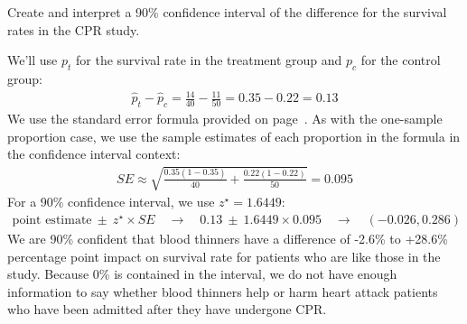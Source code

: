 \begin{examplewrap}
\begin{nexample}{
    Create and interpret a 90\% confidence interval of the
    difference for the survival rates in the CPR study.}

  We'll use $p_t$ for the survival
  rate in the treatment group and $p_c$ for the control
  group:
  \begin{align*}
  \hat{p}_{t} - \hat{p}_{c}
    = \frac{14}{40} - \frac{11}{50}
    = 0.35 - 0.22
    = 0.13
  \end{align*}
  We use the standard error formula provided on
  page~\pageref{seForDiffOfProp}.
  As with the one-sample proportion case,
  we use the sample estimates of each proportion
  in the formula in the confidence interval context:
  \begin{align*}
  SE \approx \sqrt{\frac{0.35 (1 - 0.35)}{40} +
      \frac{0.22 (1 - 0.22)}{50}}
    = 0.095
  \end{align*}
  For a 90\% confidence interval, we use $z^{\star} = 1.6449$:
  \begin{align*}
  \text{point estimate} \ \pm\ z^{\star} \times SE
    \quad \to \quad 0.13 \ \pm\ 1.6449 \times  0.095
    \quad \to \quad (-0.026, 0.286)
  \end{align*}
  We are 90\% confident that blood thinners have
  a difference of -2.6\% to +28.6\% percentage point
  impact on survival rate for patients who are like
  those in the study.
  Because 0\% is contained in the interval,
  we do not have enough information to say
  whether blood thinners help or harm
  heart attack patients who have been admitted after
  they have undergone CPR.
\end{nexample}
\end{examplewrap}



